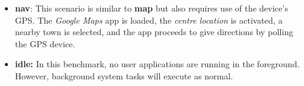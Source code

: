 \documentclass[conference]{IEEEtran}
\begin{document}
\begin{itemize}
\item \textbf{nav}: This scenario is similar to \textbf{map} but also requires use of the device's GPS. The \emph{Google Maps} app is loaded, the \emph{centre location} is activated, a nearby town is selected, and the app proceeds to give directions by polling the GPS device. 

\item \textbf{idle:} In this benchmark, no user applications are running in the foreground. However, background system tasks will execute as normal. 
\end{itemize}

\noindent
\end{document}
